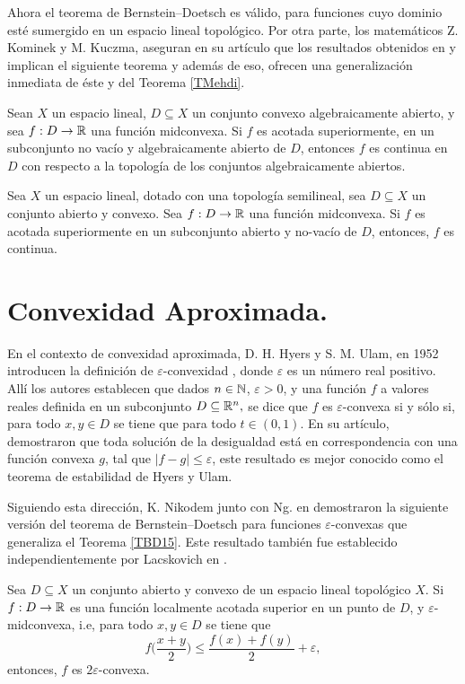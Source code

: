 Ahora el teorema de Bernstein--Doetsch es válido, para funciones cuyo
dominio esté sumergido en un espacio lineal topológico. Por otra parte, 
los matemáticos Z. Kominek y M. Kuczma, aseguran en su artículo \cite{KomKuc89b}
que los resultados obtenidos en \cite{Kom87a} y \cite{KomKuc89a} implican
el siguiente teorema y además de eso, ofrecen una generalización inmediata de 
éste y del Teorema \ref{TMehdi}.
\begin{theorem}
\label{KK1}
Sean $X$ un espacio lineal, $D\subseteq X$ un conjunto convexo algebraicamente abierto,
y sea $f:D\to\mathbb{R}$ una función midconvexa. Si $f$ es acotada superiormente, en un 
subconjunto no vacío y algebraicamente abierto de $D$, entonces $f$ es continua en $D$
con respecto a la topología de los conjuntos algebraicamente abiertos.
\end{theorem}
\begin{theorem}
\label{KK2}
Sea $X$ un espacio lineal, dotado con una topología semilineal, sea $D\subseteq X$ un 
conjunto abierto y convexo. Sea $f:D\to\mathbb{R}$ una función midconvexa. Si $f$ es acotada
superiormente en un subconjunto abierto y no-vacío de $D$, entonces, $f$ es continua.
\end{theorem}

\section{Convexidad Aproximada.}

En el contexto de convexidad aproximada, D. H. Hyers y S. M. Ulam, en 1952
introducen la definición de $\varepsilon$-convexidad \cite{HyeUla52}, donde $\varepsilon$ es un número
real positivo. Allí los autores establecen que dados $n\in\mathbb{N}$, $\varepsilon>0$, y
una función $f$ a valores reales definida en un subconjunto $D\subseteq\mathbb{R}^n,$ se 
dice que $f$ es $\varepsilon$-convexa si y sólo si, para todo $x,y\in D$ se tiene que
para todo $t\in(0,1).$ En su artículo, demostraron que toda solución de la
desigualdad  está en correspondencia con una función convexa $g$,
tal que $|f-g|\leq\varepsilon$, este resultado es mejor conocido como el teorema
de estabilidad de Hyers y Ulam. 

Siguiendo esta dirección, K. Nikodem junto con Ng. en \cite{NgNik93}
demostraron la siguiente versión del teorema de Bernstein--Doetsch para
funciones $\varepsilon$-convexas que generaliza el Teorema \ref{TBD15}. 
Este resultado también fue establecido independientemente
por Lacskovich en \cite{Lac99}.
\begin{theorem}
\label{TNgNik}
Sea $D\subseteq X$ un conjunto abierto y convexo de un espacio lineal topológico $X$. 
Si $f:D\to\mathbb{R}$ es una función localmente acotada superior en un punto de $D$, y
$\varepsilon$-midconvexa, i.e, para todo $x,y\in D$ se tiene que
$$
f\bigg(\frac{x+y}{2}\bigg)\leq\frac{f(x)+f(y)}2 + \varepsilon,
$$ 
entonces, $f$ es $2\varepsilon$-convexa.
\end{theorem}  


